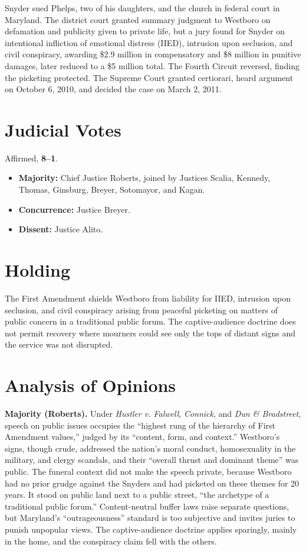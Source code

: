 \documentclass[12pt]{article}
\begin{document}
Snyder sued Phelps, two of his daughters, and the church in federal court in Maryland. The district court granted summary judgment to Westboro on defamation and publicity given to private life, but a jury found for Snyder on intentional infliction of emotional distress (IIED), intrusion upon seclusion, and civil conspiracy, awarding \$2.9 million in compensatory and \$8 million in punitive damages, later reduced to a \$5 million total. The Fourth Circuit reversed, finding the picketing protected. The Supreme Court granted certiorari, heard argument on October 6, 2010, and decided the case on March 2, 2011.

\section{Judicial Votes}

Affirmed, \textbf{8--1}.
\begin{itemize}
\item \textbf{Majority:} Chief Justice Roberts, joined by Justices Scalia, Kennedy, Thomas, Ginsburg, Breyer, Sotomayor, and Kagan.
\item \textbf{Concurrence:} Justice Breyer.
\item \textbf{Dissent:} Justice Alito.
\end{itemize}

\section{Holding}

The First Amendment shields Westboro from liability for IIED, intrusion upon seclusion, and civil conspiracy arising from peaceful picketing on matters of public concern in a traditional public forum. The captive-audience doctrine does not permit recovery where mourners could see only the tops of distant signs and the service was not disrupted.

\section{Analysis of Opinions}

\textbf{Majority (Roberts).} Under \textit{Hustler v. Falwell}, \textit{Connick}, and \textit{Dun \& Bradstreet}, speech on public issues occupies the ``highest rung of the hierarchy of First Amendment values,'' judged by its ``content, form, and context.'' Westboro's signs, though crude, addressed the nation's moral conduct, homosexuality in the military, and clergy scandals, and their ``overall thrust and dominant theme'' was public. The funeral context did not make the speech private, because Westboro had no prior grudge against the Snyders and had picketed on these themes for 20 years. It stood on public land next to a public street, ``the archetype of a traditional public forum.'' Content-neutral buffer laws raise separate questions, but Maryland's ``outrageousness'' standard is too subjective and invites juries to punish unpopular views. The captive-audience doctrine applies sparingly, mainly in the home, and the conspiracy claim fell with the others.
\end{document}
